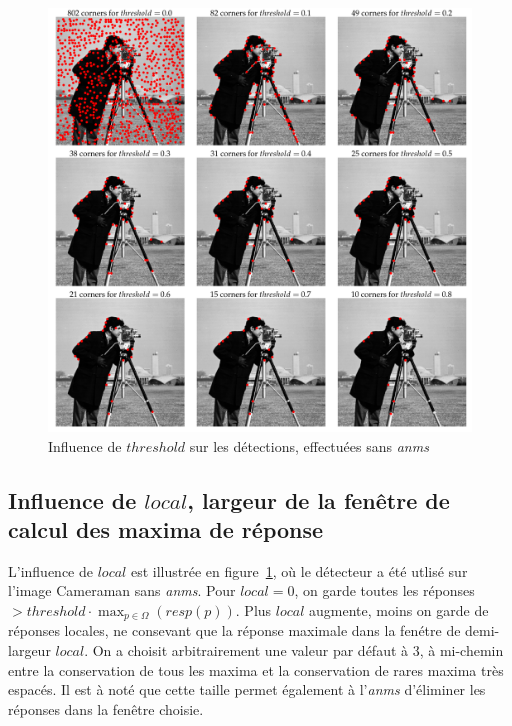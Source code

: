 \documentclass[12pt,a4paper,onecolumn]{article}
\begin{document}
\begin{figure}[H]
	\centering
	\includegraphics[width = 1.0\textwidth]{2_cameraman_threshold}
	\caption{Influence de \(threshold\) sur les détections, effectuées sans \textit{anms}}
	\label{fig_2_threshold}
\end{figure}

\subsection{Influence de \(local\), largeur de la fenêtre de calcul des maxima de réponse}

L'influence de \(local\) est illustrée en figure~\ref{fig_2_threshold}, où le détecteur a été utlisé sur l'image Cameraman sans \textit{anms}. Pour \(local = 0\), on garde toutes les réponses \(> threshold \cdot \max_{p \in \Omega}(resp(p))\). Plus \(local\) augmente, moins on garde de réponses locales, ne consevant que la réponse maximale dans la fenétre de demi-largeur \(local\). On a choisit arbitrairement une valeur par défaut à 3, à mi-chemin entre la conservation de tous les maxima et la conservation de rares maxima très espacés. Il est à noté que cette taille permet également à l'\textit{anms} d'éliminer les réponses dans la fenêtre choisie.
\end{document}
